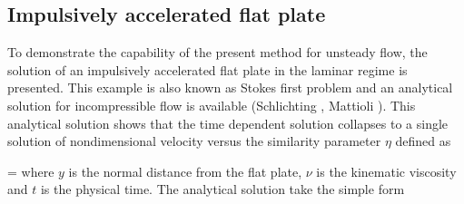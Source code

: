 %
%
%
\subsection{Impulsively accelerated flat plate}
\label{accelerated_flat_plate.subsec}
%
 To demonstrate the capability of the present method for unsteady flow,
 the solution of an impulsively accelerated flat plate in the laminar regime
 is presented. This example is also known as Stokes first problem
 and an analytical solution for incompressible flow is available
 (Schlichting , Mattioli ).
 This analytical solution shows that the time dependent
 solution collapses to a single solution of nondimensional velocity versus
 the similarity parameter $\eta$ defined as

%
\beq
  \eta = 
  \label{stokes_first1.eq}
\eeq
%
 where $y$ is the normal distance from the flat plate, $\nu$ is the kinematic
 viscosity and $t$ is the physical time. The analytical solution take the
 simple form

